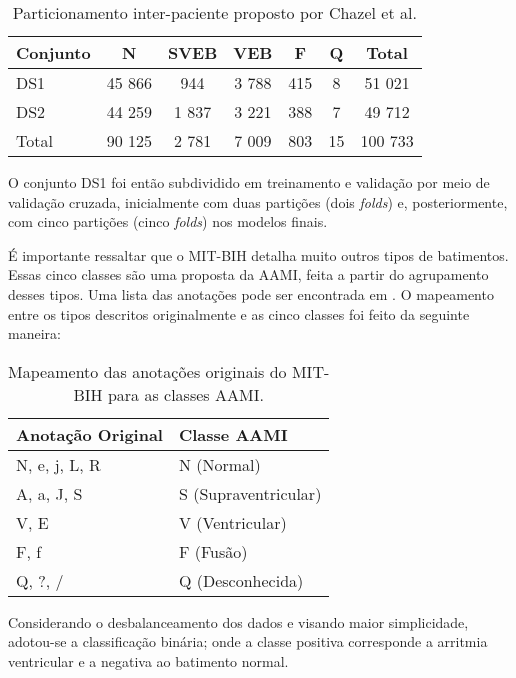 \begin{table}[htb]
\centering
\caption{Particionamento inter-paciente proposto por Chazel et al.}
\label{tab:particionamento}
\begin{tabular}{|l|c|c|c|c|c|c|}
\hline
Conjunto & N & SVEB & VEB & F & Q & Total \\ \hline
DS1 & 45 866 & 944 & 3 788 & 415 & 8 & 51 021 \\ \hline
DS2 & 44 259 & 1 837 & 3 221 & 388 & 7 & 49 712 \\ \hline
Total & 90 125 & 2 781 & 7 009 & 803 & 15 & 100 733 \\ \hline
\end{tabular}
\end{table}

O conjunto DS1 foi então subdividido em treinamento e validação por meio de validação cruzada, inicialmente com duas partições (dois \textit{folds}) e, posteriormente, com cinco partições (cinco \textit{folds}) nos modelos finais.  

É importante ressaltar que o MIT-BIH detalha muito outros tipos de batimentos. Essas cinco classes são uma proposta da AAMI, feita a partir do agrupamento desses tipos.
Uma lista das anotações pode ser encontrada em \cite{physionet_annotations}. O mapeamento entre os tipos descritos originalmente e as cinco classes foi feito da seguinte maneira:

\begin{table}[H]
\centering
\caption{Mapeamento das anotações originais do MIT-BIH para as classes AAMI.}
\label{tab:mapeamento_classes}
\begin{tabular}{ll}
\hline
\textbf{Anotação Original} & \textbf{Classe AAMI} \\
\hline
N, e, j, L, R & N (Normal) \\
A, a, J, S & S (Supraventricular) \\
V, E & V (Ventricular) \\
F, f & F (Fusão) \\
Q, ?, / & Q (Desconhecida) \\
\hline
\end{tabular}
\end{table}


Considerando o desbalanceamento dos dados e visando maior simplicidade, adotou-se a classificação binária; onde a classe positiva corresponde a arritmia ventricular e a negativa ao batimento normal.

